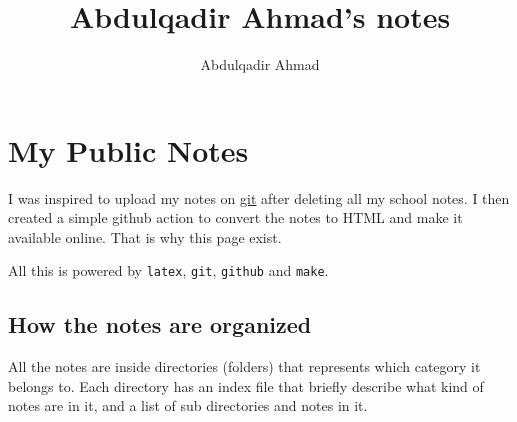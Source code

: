 \documentclass{article}
\title{Abdulqadir Ahmad's notes}
\author{Abdulqadir Ahmad}
\begin{document}
\maketitle
\section*{My Public Notes}
I was inspired to upload my notes on \href{https://github.com/arfs6/my_notes}{git} after deleting all my school notes. I then created a simple github action to convert the notes to HTML and make it available online. That is why this page exist.

All this is powered by \verb|latex|, \verb|git|, \verb|github| and \verb|make|.

\subsection*{How the notes are organized}
All the notes are inside directories (folders) that represents which category it belongs to. Each directory has an index file that briefly describe what kind of notes are in it, and a list of sub directories and notes in it.
\end{document}
